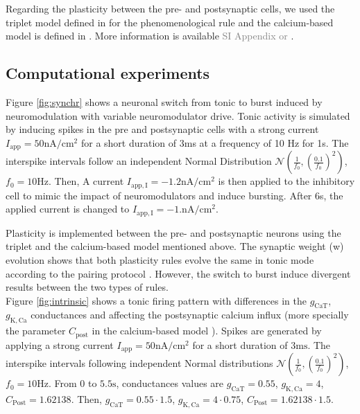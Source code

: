 Regarding the plasticity between the pre- and postsynaptic cells, we used the triplet model defined in \citep{pfister_triplets_2006} for the phenomenological rule and the calcium-based model is defined in \citep{graupner_natural_2016}. More information is available \textcolor{gray}{SI Appendix or \citep{jacquerie_switches_2022}}.



\subsection{Computational experiments}

Figure \ref{fig:synchr} shows a neuronal switch from tonic to burst induced by neuromodulation with variable neuromodulator drive. Tonic activity is simulated by inducing spikes in the pre and postsynaptic cells with a strong current $I_{\mathrm{app}} = 50 \mathrm{nA}/\mathrm{cm^2}$ for a short duration of 3ms at a frequency of 10 $\mathrm{Hz}$ for 1s. The interspike intervals follow an independent Normal Distribution $\mathcal{N}(\frac{1}{f_0}, (\frac{\num{0.1}}{f_0})^{2})$, $f_0 = 10\mathrm{Hz}$. Then, A current $I_{\mathrm{app},\mathrm{I}} = -1.2 \mathrm{nA}/\mathrm{cm^2}$ is then applied to the inhibitory cell to mimic the impact of neuromodulators and induce bursting. After 6s, the applied current is changed to $I_{\mathrm{app},\mathrm{I}} = -1.\mathrm{nA}/\mathrm{cm^2}$. 

Plasticity is implemented between the pre- and postsynaptic neurons using the triplet and the calcium-based model mentioned above. The synaptic weight (w) evolution shows that both plasticity rules evolve the same in tonic mode according to the pairing protocol \citep{sjostrom_rate_2001}. However, the switch to burst induce divergent results between the two types of rules.\\

Figure \ref{fig:intrinsic} shows a tonic firing pattern with differences in the $g_{\mathrm{CaT}}$,  $g_{\mathrm{K,Ca}}$ conductances and affecting the postsynaptic calcium influx (more specially the parameter $C_{\mathrm{post}}$ in the calcium-based model \citep{graupner_natural_2016}). Spikes are generated by applying a strong current $I_{\mathrm{app}} = 50 \mathrm{nA}/\mathrm{cm^2}$ for a short duration of $3\mathrm{ms}$. The interspike intervals following independent Normal distributions $\mathcal{N}(\frac{1}{f_0}, (\frac{\num{0.1}}{f_0})^{2})$, $f_0 = 10\mathrm{Hz}$. From 0 to $5.5\mathrm{s}$, conductances values are  $g_{\mathrm{CaT}}=0.55$, $g_{\mathrm{K,Ca}}=4$, $C_{\mathrm{Post}}=1.62138$. Then, $g_{\mathrm{CaT}}=0.55\cdot1.5$, $g_{\mathrm{K,Ca}}=4\cdot0.75$, $C_{\mathrm{Post}}=1.62138\cdot 1.5$.
